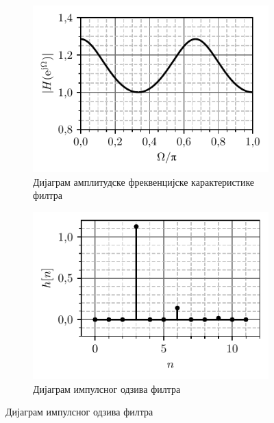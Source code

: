 \begin{figure}[ht!]
    \centering
    \begin{subfigure}{0.49\textwidth}
        \includegraphics{fig/koreni_plot.pdf}
        \caption{Дијаграм амплитудске фреквенцијске карактеристике филтра}
        \label{\ID.fig.H}    
    \end{subfigure}
    \begin{subfigure}{0.49\textwidth}
        \includegraphics{fig/koreni_h.pdf}
        \caption{Дијаграм импулсног одзива филтра}
        \label{\ID.fig.himp}    
    \end{subfigure}
\end{figure}



